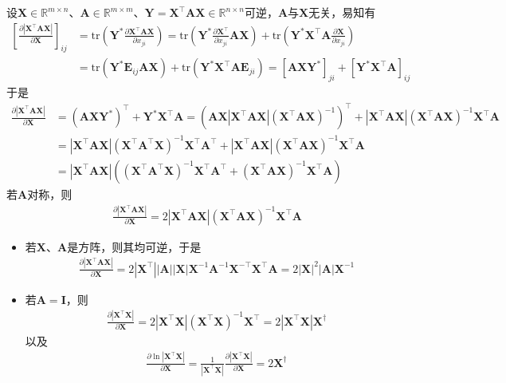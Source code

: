 \documentclass{ctexart}
\theoremstyle{definition}
\def \Av {\mathbf{A}}
\def \Ev {\mathbf{E}}
\def \Iv {\mathbf{I}}
\def \Xv {\mathbf{X}}
\def \Yv {\mathbf{Y}}
\def \Rbb {\mathbb{R}}
\def \tr {\mathrm{tr}}
\begin{document}
设$\Xv \in \Rbb^{m \times n}$、$\Av \in \Rbb^{m \times m}$、$\Yv = \Xv^\top \Av \Xv \in \Rbb^{n \times n}$可逆，$\Av$与$\Xv$无关，易知有
\begin{align*}
    \left[ \frac{\partial |\Xv^\top \Av \Xv|}{\partial \Xv} \right]_{ij} & = \tr \left( \Yv^* \frac{\partial \Xv^\top \Av \Xv}{\partial x_{ji}} \right) = \tr \left( \Yv^* \frac{\partial \Xv^\top}{\partial x_{ji}} \Av \Xv \right) + \tr \left( \Yv^* \Xv^\top \Av \frac{\partial \Xv}{\partial x_{ji}} \right) \\
                                                                         & = \tr ( \Yv^* \Ev_{ij} \Av \Xv ) + \tr ( \Yv^* \Xv^\top \Av \Ev_{ji} ) = [\Av \Xv \Yv^*]_{ji} + [\Yv^* \Xv^\top \Av]_{ij}
\end{align*}
于是
\begin{align*}
    \frac{\partial |\Xv^\top \Av \Xv|}{\partial \Xv} & = (\Av \Xv \Yv^*)^\top + \Yv^* \Xv^\top \Av = (\Av \Xv |\Xv^\top \Av \Xv| (\Xv^\top \Av \Xv)^{-1})^\top + |\Xv^\top \Av \Xv| (\Xv^\top \Av \Xv)^{-1} \Xv^\top \Av \\
                                                     & = |\Xv^\top \Av \Xv| (\Xv^\top \Av^\top \Xv)^{-1} \Xv^\top \Av^\top + |\Xv^\top \Av \Xv| (\Xv^\top \Av \Xv)^{-1} \Xv^\top \Av                                     \\
                                                     & = |\Xv^\top \Av \Xv| ((\Xv^\top \Av^\top \Xv)^{-1} \Xv^\top \Av^\top + (\Xv^\top \Av \Xv)^{-1} \Xv^\top \Av)
\end{align*}
若$\Av$对称，则
\begin{align*}
    \frac{\partial |\Xv^\top \Av \Xv|}{\partial \Xv} = 2 |\Xv^\top \Av \Xv| (\Xv^\top \Av \Xv)^{-1} \Xv^\top \Av
\end{align*}
\begin{itemize}
    \item 若$\Xv$、$\Av$是方阵，则其均可逆，于是
          \begin{align*}
              \frac{\partial |\Xv^\top \Av \Xv|}{\partial \Xv} = 2 |\Xv^\top| |\Av| |\Xv| \Xv^{-1} \Av^{-1} \Xv^{-\top} \Xv^\top \Av = 2 |\Xv|^2 |\Av| \Xv^{-1}
          \end{align*}
    \item 若$\Av = \Iv$，则
          \begin{align*}
              \frac{\partial |\Xv^\top \Xv|}{\partial \Xv} = 2 |\Xv^\top \Xv| (\Xv^\top \Xv)^{-1} \Xv^\top = 2 |\Xv^\top \Xv| \Xv^\dagger
          \end{align*}
          以及
          \begin{align*}
              \frac{\partial \ln |\Xv^\top \Xv|}{\partial \Xv} = \frac{1}{|\Xv^\top \Xv|} \frac{\partial |\Xv^\top \Xv|}{\partial \Xv} = 2 \Xv^\dagger
          \end{align*}
\end{itemize}
\end{document}
